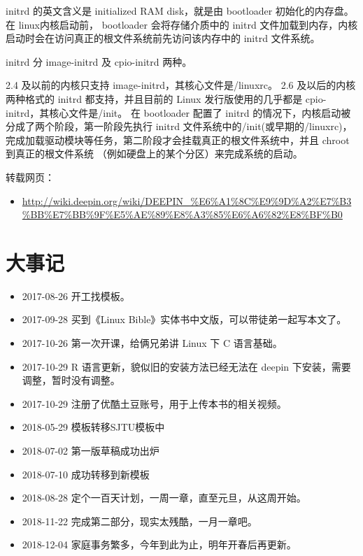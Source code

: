 \documentclass[doctor,openright,twoside]{sjtuthesis}
\providecommand{\tightlist}{%
    \setlength{\itemsep}{0pt}\setlength{\parskip}{0pt}}
\theoremstyle{plain}
\theoremstyle{definition}
\theoremstyle{remark}
\theoremstyle{ocrenumbox}
\theoremstyle{plain}
\begin{document}
initrd 的英文含义是 initialized RAM disk，就是由 bootloader
初始化的内存盘。在 linux内核启动前， bootloader 会将存储介质中的 initrd
文件加载到内存，内核启动时会在访问真正的根文件系统前先访问该内存中的
initrd 文件系统。

initrd 分 image-initrd 及 cpio-initrd 两种。

2.4 及以前的内核只支持 image-initrd，其核心文件是/linuxrc。 2.6
及以后的内核两种格式的 initrd 都支持，并且目前的 Linux
发行版使用的几乎都是 cpio-initrd，其核心文件是/init。 在 bootloader
配置了 initrd 的情况下，内核启动被分成了两个阶段，第一阶段先执行 initrd
文件系统中的/init(或早期的/linuxrc)，完成加载驱动模块等任务，第二阶段才会挂载真正的根文件系统中，并且
chroot 到真正的根文件系统 （例如硬盘上的某个分区）来完成系统的启动。

转载网页：

\begin{itemize}
\tightlist
\item
  \url{http://wiki.deepin.org/wiki/DEEPIN_\%E6\%A1\%8C\%E9\%9D\%A2\%E7\%B3\%BB\%E7\%BB\%9F\%E5\%AE\%89\%E8\%A3\%85\%E6\%A6\%82\%E8\%BF\%B0}
\end{itemize}

\hypertarget{history}{%
\chapter{大事记}\label{history}}

\begin{itemize}
\tightlist
\item
  2017-08-26 开工找模板。
\item
  2017-09-28 买到《Linux Bible》实体书中文版，可以带徒弟一起写本文了。
\item
  2017-10-26 第一次开课，给俩兄弟讲 Linux 下 C 语言基础。
\item
  2017-10-29 R 语言更新，貌似旧的安装方法已经无法在 deepin
  下安装，需要调整，暂时没有调整。
\item
  2017-10-29 注册了优酷土豆账号，用于上传本书的相关视频。
\item
  2018-05-29 模板转移SJTU模板中
\item
  2018-07-02 第一版草稿成功出炉
\item
  2018-07-10 成功转移到新模板
\item
  2018-08-28 定个一百天计划，一周一章，直至元旦，从这周开始。
\item
  2018-11-22 完成第二部分，现实太残酷，一月一章吧。
\item
  2018-12-04 家庭事务繁多，今年到此为止，明年开春后再更新。
\end{itemize}

\backmatter	%

\printindex

\printbibliography[heading=bibintoc]
\end{document}
